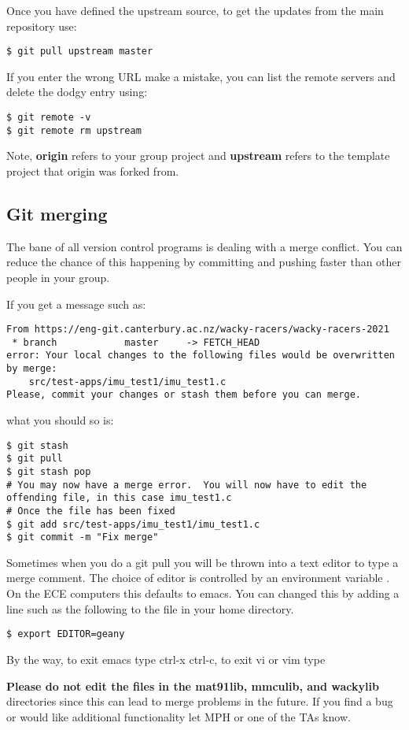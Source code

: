 Once you have defined the upstream source, to get the updates from the
main repository use:
%
\begin{verbatim}
$ git pull upstream master
\end{verbatim}

If you enter the wrong URL make a mistake, you can list the remote
servers and delete the dodgy entry using:

\begin{verbatim}
$ git remote -v
$ git remote rm upstream
\end{verbatim}

Note, \textbf{origin} refers to your group project and \textbf{upstream}
refers to the template project that origin was forked from.

\subsection{Git merging}
\label{git-merging}

The bane of all version control programs is dealing with a merge
conflict. You can reduce the chance of this happening by committing and
pushing faster than other people in your group.

If you get a message such as:

\begin{verbatim}
From https://eng-git.canterbury.ac.nz/wacky-racers/wacky-racers-2021
 * branch            master     -> FETCH_HEAD
error: Your local changes to the following files would be overwritten by merge:
    src/test-apps/imu_test1/imu_test1.c
Please, commit your changes or stash them before you can merge.
\end{verbatim}

what you should so is:

\begin{verbatim}
$ git stash
$ git pull
$ git stash pop
# You may now have a merge error.  You will now have to edit the offending file, in this case imu_test1.c
# Once the file has been fixed
$ git add src/test-apps/imu_test1/imu_test1.c
$ git commit -m "Fix merge"
\end{verbatim}

Sometimes when you do a git pull you will be thrown into a text editor
to type a merge comment. The choice of editor is controlled by an
environment variable . On the ECE computers this defaults
to emacs. You can changed this by adding a line such as the following to
the  file in your home directory.

\begin{verbatim}
$ export EDITOR=geany
\end{verbatim}

By the way, to exit emacs type ctrl-x ctrl-c, to exit vi or vim type 

\textbf{Please do not edit the files in the mat91lib, mmculib, and
wackylib} directories since this can lead to merge problems in the
future. If you find a bug or would like additional functionality let MPH
or one of the TAs know.
